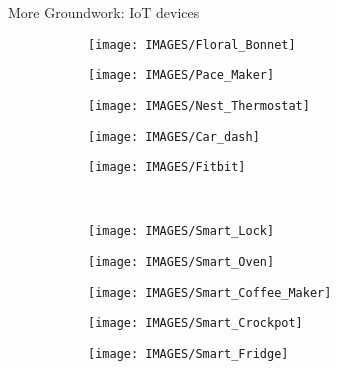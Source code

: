 \begin{frame}
	{
		{More Groundwork:}\linebreak
		{IoT devices}
	}

	\begin{figure}[H]
		\centering
		\begin{subfigure}{.2\linewidth}
			\centering
			\texttt{[image: IMAGES/Floral\_Bonnet]}
			\label{fig:sub1}
		\end{subfigure}%
		\begin{subfigure}{.2\linewidth}
			\centering
			\texttt{[image: IMAGES/Pace\_Maker]}
			\label{fig:sub1}
		\end{subfigure}%
		\begin{subfigure}{0.2\linewidth}
			\centering
			\texttt{[image: IMAGES/Nest\_Thermostat]}
			\label{fig:sub1}
		\end{subfigure}%
		\begin{subfigure}{0.2\linewidth}
			\centering
			\texttt{[image: IMAGES/Car\_dash]}
			\label{fig:sub1}
		\end{subfigure}%
		\begin{subfigure}{0.2\linewidth}
			\centering
			\texttt{[image: IMAGES/Fitbit]}
			\label{fig:sub2}
		\end{subfigure}\\[1ex]

		\begin{subfigure}{0.2\linewidth}
			\centering
			\texttt{[image: IMAGES/Smart\_Lock]}
			\label{fig:sub1}
		\end{subfigure}%
		\begin{subfigure}{0.2\linewidth}
			\centering
			\texttt{[image: IMAGES/Smart\_Oven]}
			\label{fig:sub1}
		\end{subfigure}%
		\begin{subfigure}{0.2\linewidth}
			\centering
			\texttt{[image: IMAGES/Smart\_Coffee\_Maker]}
			\label{fig:sub1}
		\end{subfigure}%
		\begin{subfigure}{0.2\linewidth}
			\centering
			\texttt{[image: IMAGES/Smart\_Crockpot]}
			\label{fig:sub1}
		\end{subfigure}%
		\begin{subfigure}{0.2\linewidth}
			\centering
			\texttt{[image: IMAGES/Smart\_Fridge]}
			\label{fig:sub2}
		\end{subfigure}\\[1ex]


\end{figure}
\end{frame}
